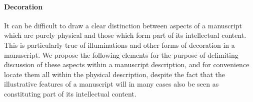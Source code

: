 \paragraph[{Decoration}]{Decoration}\label{msphdec}\par
It can be difficult to draw a clear distinction between aspects of a manuscript which are purely physical and those which form part of its intellectual content. This is particularly true of illuminations and other forms of decoration in a manuscript. We propose the following elements for the purpose of delimiting discussion of these aspects within a manuscript description, and for convenience locate them all within the physical description, despite the fact that the illustrative features of a manuscript will in many cases also be seen as constituting part of its intellectual content.\par
